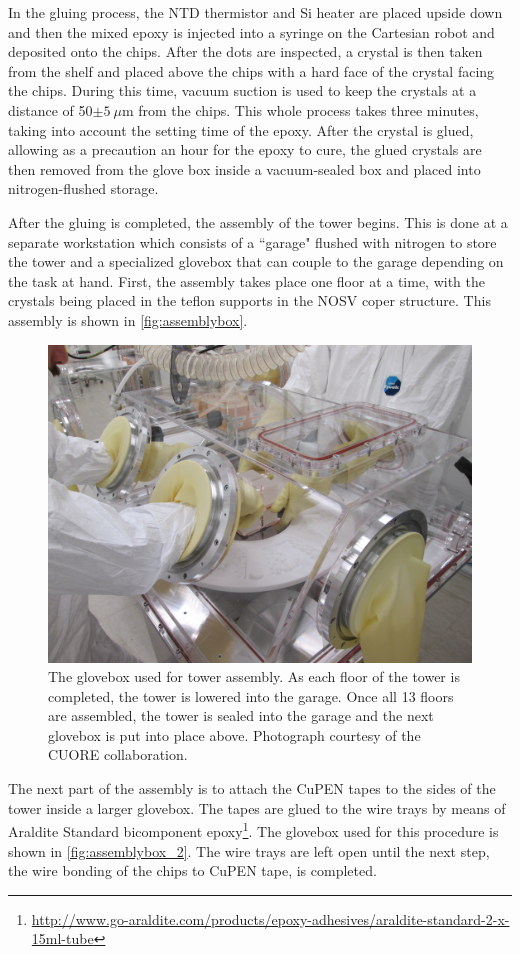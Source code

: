 In the gluing process, the NTD thermistor and Si heater are placed upside down and then the mixed epoxy is injected into a syringe on the Cartesian robot and deposited onto the chips.
After the dots are inspected, a crystal is then taken from the shelf and placed above the chips with a hard face of the crystal facing the chips.
During this time, vacuum suction is used to keep the crystals at a distance of 50$\pm 5~\mu$m from the chips.
This whole process takes three minutes, taking into account the setting time of the epoxy.
After the crystal is glued, allowing as a precaution an hour for the epoxy to cure, the glued crystals are then removed from the glove box inside a vacuum-sealed box and placed into nitrogen-flushed storage.

After the gluing is completed, the assembly of the tower begins.
This is done at a separate workstation which consists of a ``garage" flushed with nitrogen to store the tower and a specialized glovebox that can couple to the garage depending on the task at hand.
First, the assembly takes place one floor at a time, with the crystals being placed in the teflon supports in the NOSV coper structure.
This assembly is shown in \autoref{fig:assemblybox}.

\begin{figure}[htbp]
    \centering
    \includegraphics[width=0.6\linewidth]{Figures/TowerAssemblyBox.jpg}
    \caption[The glovebox used for tower assembly]
    {The glovebox used for tower assembly.
    As each floor of the tower is completed, the tower is lowered into the garage.
    Once all 13 floors are assembled, the tower is sealed into the garage and the next glovebox is put into place above.
    Photograph courtesy of the CUORE collaboration.}
    \label{fig:assemblybox}
\end{figure}

The next part of the assembly is to attach the CuPEN tapes to the sides of the tower inside a larger glovebox.
The tapes are glued to the wire trays by means of Araldite Standard bicomponent epoxy\footnote{\RaggedRight\url{http://www.go-araldite.com/products/epoxy-adhesives/araldite-standard-2-x-15ml-tube}}.
The glovebox used for this procedure is shown in \autoref{fig:assemblybox_2}.
The wire trays are left open until the next step, the wire bonding of the chips to CuPEN tape, is completed.


